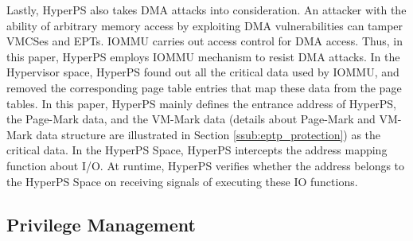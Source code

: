 Lastly, HyperPS also takes DMA attacks into consideration. An attacker with the ability of arbitrary memory access by exploiting DMA vulnerabilities can tamper VMCSes and EPTs. IOMMU carries out access control for DMA access. Thus, in this paper, HyperPS employs IOMMU mechanism to resist DMA attacks.
In the Hypervisor space, HyperPS found out all the critical data used by IOMMU, and removed the corresponding page table entries that map these data from the page tables. In this paper, HyperPS mainly defines the entrance address of HyperPS, the Page-Mark data, and the VM-Mark data (details about Page-Mark and VM-Mark data structure are illustrated in Section \ref{ssub:eptp_protection}) as the critical data.
In the HyperPS Space, HyperPS intercepts the address mapping function about I/O. At runtime, HyperPS verifies whether the address belongs to the HyperPS Space on receiving signals of executing these IO functions. 



\subsection{Privilege Management}%
\label{sub:privilege_management}

